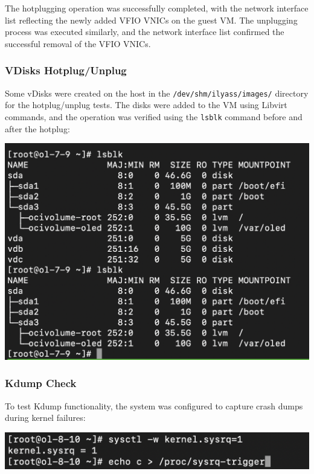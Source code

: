 The hotplugging operation was successfully completed, with the network interface list reflecting the newly added VFIO VNICs on the guest VM. The unplugging process was executed similarly, and the network interface list confirmed the successful removal of the VFIO VNICs.

\subsubsection[VDisks Hotplug/Unplug]{VDisks Hotplug/Unplug}

Some vDisks were created on the host in the \texttt{/dev/shm/ilyass/images/} directory for the hotplug/unplug tests. The disks were added to the VM using Libvirt commands, and the operation was verified using the \texttt{lsblk} command before and after the hotplug:

\begin{center}
    \centering
    \includegraphics[width=\textwidth]{Images/lsblk after hotplug and after ungplug.png}
    \label{fig}
\end{center}

\subsubsection[Kdump Check]{Kdump Check}

To test Kdump functionality, the system was configured to capture crash dumps during kernel failures:

\begin{center}
    \centering
    \includegraphics[width=\textwidth]{Images/kdump test 3.png}
    \label{fig}
\end{center}

